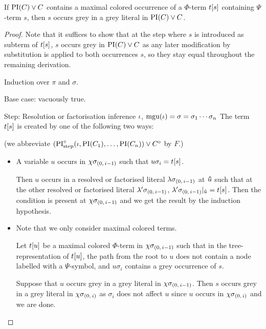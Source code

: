 \documentclass[,%
	draft=false,%
	numbers=noendperiod
	12pt,
	a4paper,
	oneside,%
	openany,
]{memoir}
\newcommand{\inv}{\ensuremath{\chi}}
\begin{document}
\begin{lemma}
	If ${\operatorname{PI}(C) \lor C}$ contains a maximal colored occurrence of a $\Phi$-term $t[s]$ containing $\Psi$-term $s$, then 
	$s$ occurs grey in a grey literal in $\operatorname{PI}(C) \lor C$.
\end{lemma}
\begin{proof}
	Note that it suffices to show that at the step where $s$ is introduced as subterm of $t[s]$, $s$ occurs grey in $\operatorname{PI}(C) \lor C$ as any later modification by substitution is applied to both occurrences $s$, so they stay equal throughout the remaining derivation.
	\medskip

	\noindent
	Induction over $\pi$ and $\sigma$. 
	\medskip

	\noindent
	Base case: vacuously true.
	\medskip

	\noindent
	Step:
	Resolution or factorisation inference $\iota$, $\operatorname{mgu}(\iota) = \sigma = \sigma_1\cdots\sigma_n$ 
	The term $t[s]$ is created by one of the following two ways: 

	(we abbreviate 
	$(\operatorname{PI}^{\circ}_{\mathrm{step}}(\iota, \operatorname{PI}(C_1), \dots, \operatorname{PI}(C_n)) \lor C^\circ$ by $F$.)
	\begin{itemize}
		\item
			A variable $u$ occurs in $\inv\sigmazmi$ such that $u\sigma_i = t[s]$.

			Then $u$ occurs in a resolved or factorised literal $\lambda\sigma_{(0,\,i-1)}$ at $\bm\hat u$ such that at the other resolved or factorised literal $\lambda'\sigma_{(0,\,i-1)}$, $\lambda'\sigma_{(0,\,i-1)}|_{\bm\hat u} = t[s]$.
			Then the condition is present at $\inv\sigmazmi$ and we get the result by the induction hypothesis.

		\item 
			Note that we only consider maximal colored terms.

			Let $t[u]$ be a maximal colored $\Phi$-term in $\inv\sigmazmi$ such that in the tree-representation of $t[u]$, the path from the root to $u$ does not contain a node labelled with a $\Psi$-symbol, and $u\sigma_i$ contains a grey occurrence of $s$.


			Suppose that $u$ occurs grey in a grey literal in $\inv\sigmazmi$.
			Then $s$ occurs grey in a grey literal in $\inv\sigmazi$ as $\sigma_i$ does not affect $u$ since $u$ occurs in $\inv\sigmazi$ and we are done.


\end{itemize}
\end{proof}
\end{document}
